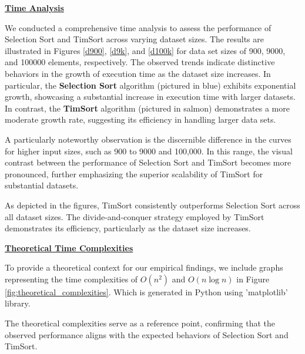 \documentclass[article,10pt]{article}
\begin{document}
\begin{multicols}{2}
\begin{center} \underline{\textbf{Time Analysis}} \end{center}
We conducted a comprehensive time analysis to assess the performance of Selection Sort and TimSort across varying dataset sizes. The results are illustrated in Figures \ref{d900}, \ref{d9k}, and \ref{d100k} for data set sizes of 900, 9000, and 100000 elements, respectively. The observed trends indicate distinctive behaviors in the growth of execution time as the dataset size increases. In particular, the \textbf{Selection Sort} algorithm (pictured in blue) exhibits exponential growth, showcasing a substantial increase in execution time with larger datasets. In contrast, the \textbf{TimSort} algorithm (pictured in salmon) demonstrates a more moderate growth rate, suggesting its efficiency in handling larger data sets.

A particularly noteworthy observation is the discernible difference in the curves for higher input sizes, such as 900 to 9000 and 100,000. In this range, the visual contrast between the performance of Selection Sort and TimSort becomes more pronounced, further emphasizing the superior scalability of TimSort for substantial datasets. 

As depicted in the figures, TimSort consistently outperforms Selection Sort across all dataset sizes. The divide-and-conquer strategy employed by TimSort demonstrates its efficiency, particularly as the dataset size increases.










\vspace{ }
\noindent
\begin{center} \underline{\textbf{Theoretical Time Complexities}} \end{center}

To provide a theoretical context for our empirical findings, we include graphs representing the time complexities of \(O(n^2)\) and \(O(n \log n)\) in Figure \ref{fig:theoretical_complexities}. Which is generated in Python using 'matplotlib' library. 

The theoretical complexities serve as a reference point, confirming that the observed performance aligns with the expected behaviors of Selection Sort and TimSort.


\end{multicols}
\end{document}
